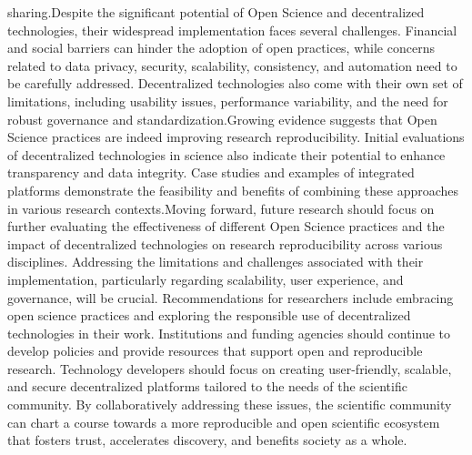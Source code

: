 \documentclass{article}
\begin{document}
sharing.Despite the significant potential of Open Science and decentralized technologies, their widespread implementation faces several challenges. Financial and social barriers can hinder the adoption of open practices, while concerns related to data privacy, security, scalability, consistency, and automation need to be carefully addressed. Decentralized technologies also come with their own set of limitations, including usability issues, performance variability, and the need for robust governance and standardization.Growing evidence suggests that Open Science practices are indeed improving research reproducibility. Initial evaluations of decentralized technologies in science also indicate their potential to enhance transparency and data integrity. Case studies and examples of integrated platforms demonstrate the feasibility and benefits of combining these approaches in various research contexts.Moving forward, future research should focus on further evaluating the effectiveness of different Open Science practices and the impact of decentralized technologies on research reproducibility across various disciplines. Addressing the limitations and challenges associated with their implementation, particularly regarding scalability, user experience, and governance, will be crucial. Recommendations for researchers include embracing open science practices and exploring the responsible use of decentralized technologies in their work. Institutions and funding agencies should continue to develop policies and provide resources that support open and reproducible research. Technology developers should focus on creating user-friendly, scalable, and secure decentralized platforms tailored to the needs of the scientific community. By collaboratively addressing these issues, the scientific community can chart a course towards a more reproducible and open scientific ecosystem that fosters trust, accelerates discovery, and benefits society as a whole.



\renewcommand{\arraystretch}{1.5}
\end{document}
